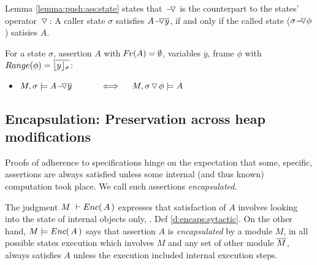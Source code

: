  Lemma \ref{lemma:push:ass:state}  states that $\FIXSymbolA$ is the counterpart to the states' operator $\pushSymbol$:
A caller state
$\sigma$ satisfies  $\PushAS y A$, if and only if the called state  ($\PushASLong {\phi} {\sigma}$) %
satisies $A$.  


\begin{lemma} 
\label{lemma:push:ass:state}
For a  state  $\sigma$, assertion $A$ with $\fv(A)=\emptyset$,  variables   $\overline y$, frame $\phi$ with $Range (\phi)=\overline {\interpret \sigma y}$:


\begin{itemize} %
 \item
 \label{lemma:push:ass:state:one}
 \label{lemma:push:ass:state:two}
$M, \sigma \models \PushAS  {y} {A}\ \  \ \ \ \ \  \ \ \    \Longleftrightarrow  \ \ \ \ M,  \PushSLong {\phi} {\sigma}   \models A$
\end{itemize}  %
\end{lemma}


 
\subsection{Encapsulation: Preservation across heap modifications}
\label{s:preserve:encaps}
 
Proofs of adherence to {\SpecLang specifications  hinge on the expectation that some,  specific, assertions are always satisfied unless some 
} internal (and thus known) computation took place. 
{We call such assertions   \emph{encapsulated}.}
 

The judgment $M\ \vdash \encaps{A}$  expresses that satisfaction of $A$ involves looking into the state of  
internal objects only,  \cf. Def \ref{d:encaps:sytactic}.
{On the other hand, $M  \models \encaps{A}$ says that assertion $A$  is  \emph{encapsulated} by a module $M$, \ie in all possible states %
execution which involves $M$ and any set of other module $\Mtwo$, always satisfies  $A$  unless the execution  included internal execution steps}.
 


